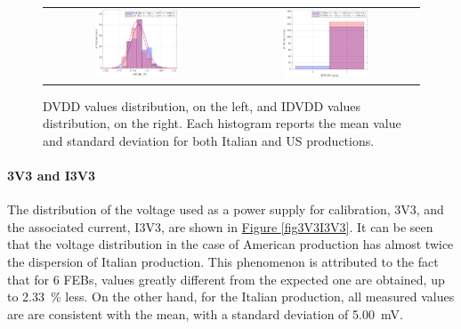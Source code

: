 \begin{figure}[h!]
    \centering
    \begin{tabular}{cc}
        \includegraphics[width=0.467\textwidth]{Images/chap2/results/DVDD.pdf} & \includegraphics[width=0.477\textwidth]{Images/chap2/results/IDVDD.pdf}\\
    \end{tabular}
    \caption{DVDD values distribution, on the left, and IDVDD values distribution, on the right. Each histogram reports the mean value and standard deviation for both Italian and US productions.}
    \label{figDVDDIDVDD}
\end{figure}

\paragraph{3V3 and I3V3} The distribution of the voltage used as a power supply for calibration, 3V3, and the associated current, I3V3, are shown in \hyperref[fig3V3I3V3]{Figure \ref{fig3V3I3V3}}. It can be seen that the voltage distribution in the case of American production has almost twice the dispersion of Italian production. This phenomenon is attributed to the fact that for 6 FEBs, values greatly different from the expected one are obtained, up to \SI{2.33}{\percent} less. On the other hand, for the Italian production, all measured values are are consistent with the mean, with a standard deviation of \SI{5.00}{\milli\volt}.


